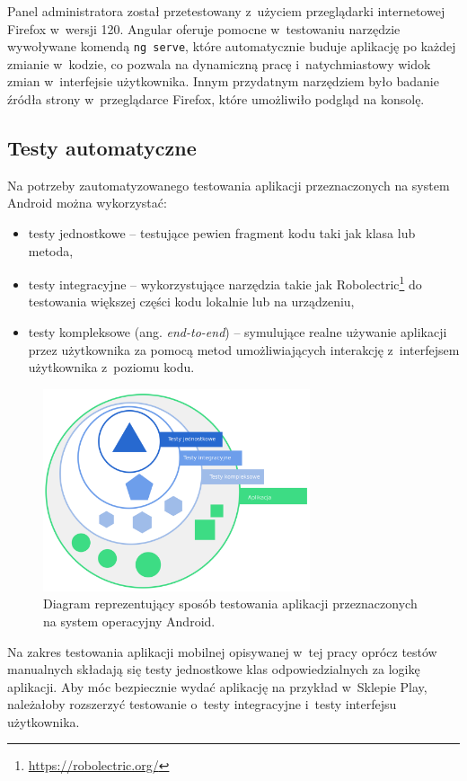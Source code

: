 \documentclass[a4paper,twoside,12pt]{book}
\newcommand{\obcy}[1]{\emph{#1}}
\newcommand{\english}[1]{{\selectlanguage{british}\obcy{#1}}}
\begin{document}
Panel administratora został przetestowany z~użyciem przeglądarki internetowej Firefox w~wersji 120. Angular oferuje pomocne w~testowaniu narzędzie wywoływane komendą \texttt{ng serve}, które automatycznie buduje aplikację po każdej zmianie w~kodzie, co pozwala na dynamiczną pracę i~natychmiastowy widok zmian w~interfejsie użytkownika. Innym przydatnym narzędziem było badanie źródła strony w~przeglądarce Firefox, które umożliwiło podgląd na konsolę. 

\subsection{Testy automatyczne}

Na potrzeby zautomatyzowanego testowania aplikacji przeznaczonych na system Android można wykorzystać:
\begin{itemize}
\item testy jednostkowe -- testujące pewien fragment kodu taki jak klasa lub metoda,
\item testy integracyjne -- wykorzystujące narzędzia takie jak Robolectric\footnote{\url{https://robolectric.org/}} do testowania większej części kodu lokalnie lub na urządzeniu,
\item testy kompleksowe (ang. \english{end-to-end}) -- symulujące realne używanie aplikacji przez użytkownika za pomocą metod umożliwiających interakcję z~interfejsem użytkownika z~poziomu kodu.
\end{itemize}

\begin{figure}[]
\centering
\includegraphics[width=0.7\textwidth]{test-scopes}
\caption{Diagram reprezentujący sposób testowania aplikacji przeznaczonych na system operacyjny Android.}
\label{fig:testscopes}
\end{figure}

Na zakres testowania aplikacji mobilnej opisywanej w~tej pracy oprócz testów manualnych składają się testy jednostkowe klas odpowiedzialnych za logikę aplikacji. Aby móc bezpiecznie wydać aplikację na przykład w~Sklepie Play, należałoby rozszerzyć testowanie o~testy integracyjne i~testy interfejsu użytkownika. 
\end{document}
